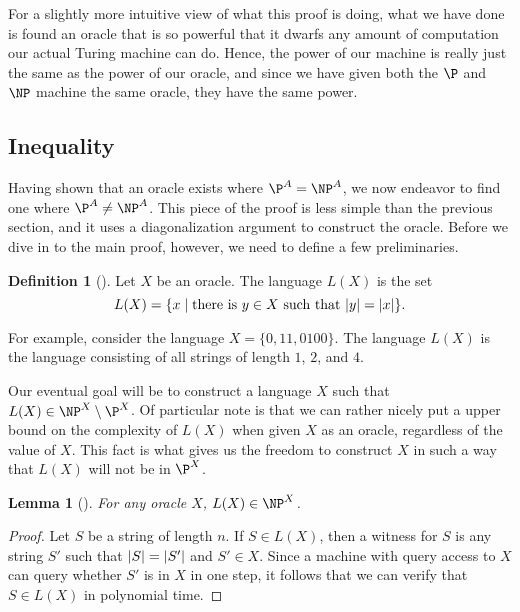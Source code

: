 \documentclass[english,12pt]{reedthesis}
\theoremstyle{plain}
\newtheorem{lemma}[lemma]{Lemma}
\theoremstyle{definition}
\newtheorem{defn}[defn]{Definition}
\theoremstyle{remark}
\DeclarePairedDelimiter{\abs}{\lvert}{\rvert}
\begin{document}
For a slightly more intuitive view of what this proof is doing, what we have
done is found an oracle that is so powerful that it dwarfs any amount of
computation our actual Turing machine can do. Hence, the power of our machine is
really just the same as the power of our oracle, and since we have given both
the $\P$ and $\NP$ machine the same oracle, they have the same power.

\subsection{Inequality}

Having shown that an oracle exists where $\P^{A} = \NP^{A}$, we now endeavor to
find one where $\P^{A} \ne \NP^{A}$. This piece of the proof is less simple than
the previous section, and it uses a diagonalization argument to construct the
oracle. Before we dive in to the main proof, however, we need to define a few
preliminaries.

\begin{defn}[{\cite[436]{BGS75}}]\label{def:l(x)}
  Let $X$ be an oracle. The language $L(X)$ is the set
  \begin{equation*}
    L(X) = \{x \mid \text{there is } y \in X \text{ such that } \abs{y} = \abs{x}\}.
  \end{equation*}
\end{defn}

For example, consider the language $X = \{0, 11, 0100\}$. The language $L(X)$ is
the language consisting of all strings of length $1$, $2$, and $4$.

Our eventual goal will be to construct a language $X$ such that
$L(X) \in \NP^{X} \setminus \P^{X}$. Of particular note is that we can rather nicely put a
upper bound on the complexity of $L(X)$ when given $X$ as an oracle, regardless
of the value of $X$. This fact is what gives us the freedom to construct $X$ in
such a way that $L(X)$ will not be in $\P^{X}$.

\begin{lemma}[{\cite[436]{BGS75}}]\label{lem:l(x)-in-np}
  For any oracle $X$, $L(X) \in \NP^{X}$.
\end{lemma}

\begin{proof}
  Let $S$ be a string of length $n$. If $S \in L(X)$, then a witness for $S$ is
  any string $S'$ such that $\abs{S} = \abs{S'}$ and $S' \in X$. Since a machine
  with query access to $X$ can query whether $S'$ is in $X$ in one step, it
  follows that we can verify that $S \in L(X)$ in polynomial time.
\end{proof}
\end{document}
